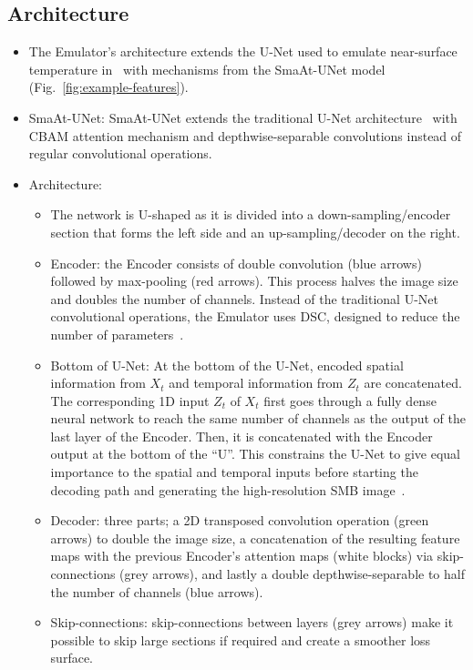 \documentclass[a4paper,11pt,oneside]{report}
\begin{document}
\subsection{Architecture}\label{subsec:architecture}
\begin{itemize}
    \item The Emulator's architecture extends the U-Net used to emulate near-surface temperature in~\cite{Doury} with mechanisms from the SmaAt-UNet model~\cite{smatunet} (Fig.~\ref{fig:example-features}).
     \item SmaAt-UNet: SmaAt-UNet extends the traditional U-Net architecture~\cite{unet} with CBAM attention mechanism and depthwise-separable convolutions instead of regular convolutional operations. 
    \item Architecture: 
    \begin{itemize}
    \item The network is U-shaped as it is divided into a down-sampling/encoder section that forms the left side and an up-sampling/decoder on the right.
    \item Encoder: the Encoder consists of double convolution (blue arrows) followed by max-pooling (red arrows). This process halves the image size and doubles the number of channels. Instead of the traditional U-Net convolutional operations, the Emulator uses DSC, designed to reduce the number of parameters~\cite{smatunet}.
    \item Bottom of U-Net: At the bottom of the U-Net, encoded spatial information from $X_t$ and temporal information from $Z_t$ are concatenated. The corresponding 1D input $Z_t$ of $X_t$ first goes through a fully dense neural network to reach the same number of channels as the output of the last layer of the Encoder. Then, it is concatenated with the Encoder output at the bottom of the “U”. This constrains the U-Net to give equal importance to the spatial and temporal inputs before starting the decoding path and generating the high-resolution SMB image~\cite{Doury}. 
    \item Decoder: three parts; a 2D transposed convolution operation (green arrows) to double the image size, a concatenation of the resulting feature maps with the previous Encoder’s attention maps (white blocks) via skip-connections (grey arrows), and lastly a double depthwise-separable to half the number of channels (blue arrows). 
    \item Skip-connections: skip-connections between layers (grey arrows) make it possible to skip large sections if required and create a smoother loss surface. 

\end{itemize}
\end{itemize}
\end{document}
